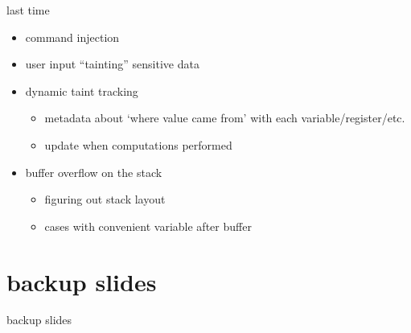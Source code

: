 \date{}
\title{}
\date{}

\begin{frame}
    \titlepage
\end{frame}



\begin{frame}{last time}
    \begin{itemize}
    \item command injection
    \item user input ``tainting'' sensitive data
    \item dynamic taint tracking
        \begin{itemize}
        \item metadata about `where value came from' with each variable/register/etc.
        \item update when computations performed
        \end{itemize}
    \item buffer overflow on the stack
        \begin{itemize}
        \item figuring out stack layout
        \item cases with convenient variable after buffer
        \end{itemize}
    \end{itemize}
\end{frame}





\section{backup slides}
\begin{frame}{backup slides}
\end{frame}






